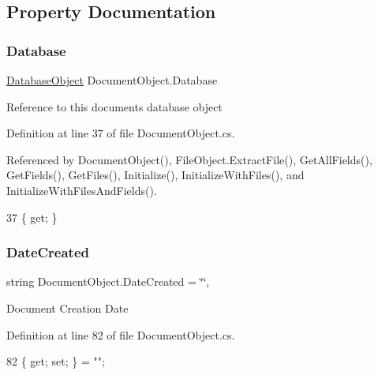 \subsection{Property Documentation}
\mbox{\label{class_document_object_a69d5338c9835f748490323d2950eed09}} 
\subsubsection{\texorpdfstring{Database}{Database}}
{\footnotesize\ttfamily \mbox{\hyperlink{class_database_object}{Database\+Object}} Document\+Object.\+Database\hspace{0.3cm}{\ttfamily [get]}}



Reference to this documents database object 



Definition at line 37 of file Document\+Object.\+cs.



Referenced by Document\+Object(), File\+Object.\+Extract\+File(), Get\+All\+Fields(), Get\+Fields(), Get\+Files(), Initialize(), Initialize\+With\+Files(), and Initialize\+With\+Files\+And\+Fields().


\begin{DoxyCode}
37 \{ \textcolor{keyword}{get}; \}
\end{DoxyCode}
\mbox{\label{class_document_object_a819cb8baad094f6e5990c54ec1eee8b0}} 
\subsubsection{\texorpdfstring{Date\+Created}{DateCreated}}
{\footnotesize\ttfamily string Document\+Object.\+Date\+Created = \char`\"{}\char`\"{}\hspace{0.3cm}{\ttfamily [get]}, {\ttfamily [set]}}



Document Creation Date 



Definition at line 82 of file Document\+Object.\+cs.


\begin{DoxyCode}
82 \{ \textcolor{keyword}{get}; \textcolor{keyword}{set}; \} = \textcolor{stringliteral}{""};
\end{DoxyCode}
\mbox{\label{class_document_object_a87ba1b3ac1b74b104972c25b245c504b}} 
